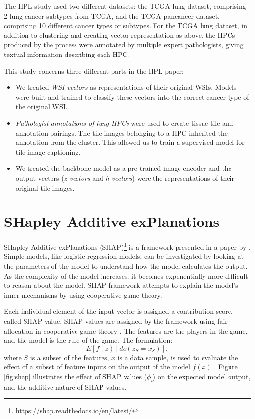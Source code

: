 \documentclass{l4proj}
\begin{document}
The HPL study used two different datasets: the TCGA lung dataset, comprising 2 lung cancer subtypes from TCGA, and the TCGA pancancer dataset, comprising 10 different cancer types or subtypes. For the TCGA lung dataset, in addition to clustering and creating vector representation as above, the HPCs produced by the process were annotated by multiple expert pathologists, giving textual information describing each HPC. 

This study concerns three different parts in the HPL paper:
\begin{itemize}
    \item We treated \emph{WSI vectors} as representations of their original WSIs. Models were built and trained to classify these vectors into the correct cancer type of the original WSI.
    \item \emph{Pathologist annotations of lung HPCs} were used to create tissue tile and annotation pairings. The tile images belonging to a HPC inherited the annotation from the cluster. This allowed us to train a supervised model for tile image captioning.
    \item We treated the backbone model as a pre-trained image encoder and the output vectors (\emph{z-vectors} and \emph{h-vectors}) were the representations of their original tile images.
\end{itemize}

\section{SHapley Additive exPlanations}
SHapley Additive exPlanations (SHAP)\footnote{https://shap.readthedocs.io/en/latest/} is a framework presented in a paper by \cite{lundberg2017}. Simple models, like logistic regression models, can be investigated by looking at the parameters of the model to understand how the model calculates the output. As the complexity of the model increases, it becomes exponentially more difficult to reason about the model. SHAP framework attempts to explain the model's inner mechanisms by using cooperative game theory.

Each individual element of the input vector is assigned a contribution score, called SHAP value. SHAP values are assigned by the framework using fair allocation in cooperative game theory \citep{Szymaski2025}. The features are the players in the game, and the model is the rule of the game. The formulation:
\begin{equation}
    E[f(z)\ |\ do(z_S = x_S)],
\end{equation}
where $S$ is a subset of the features, $x$ is a data sample, is used to evaluate the effect of a subset of feature inputs on the output of the model $f(x)$ \citep{ShapDoc}. Figure \ref{fig:shap} illustrates the effect of SHAP values ($\phi_i$) on the expected model output, and the additive nature of SHAP values.
\end{document}
